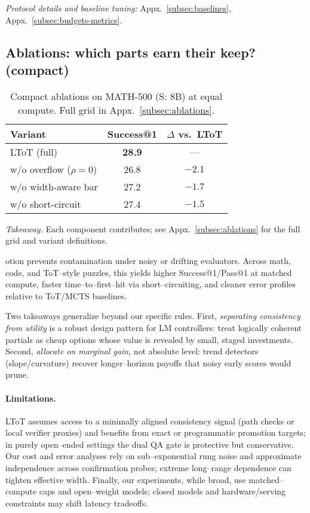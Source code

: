 \documentclass{article}
\begin{document}
\noindent\emph{Protocol details and baseline tuning:} Appx.~\ref{subsec:baselines}, Appx.~\ref{subsec:budgets-metrics}.
\subsection{Ablations: which parts earn their keep? (compact)}\label{subsec:ablations-mini}
\begin{table}[t]
\centering
\caption{Compact ablations on MATH-500 (S: 8B) at equal compute. Full grid in Appx.~\ref{subsec:ablations}.}
\vspace{0.3em}
\begin{tabular}{lcc}
\toprule
\textbf{Variant} & \textbf{Success@1} & \textbf{$\Delta$ vs.\ LToT} \\
\midrule
LToT (full)                         & \textbf{28.9} & --- \\
\quad w/o overflow ($\rho{=}0$)     & 26.8 & $-2.1$ \\
\quad w/o width-aware bar           & 27.2 & $-1.7$ \\
\quad w/o short-circuit             & 27.4 & $-1.5$ \\
\bottomrule
\end{tabular}
\label{tab:ablations-mini}
\end{table}
\noindent\textit{Takeaway.} Each component contributes; see Appx.~\ref{subsec:ablations} for the full grid and variant definitions.

otion prevents contamination under noisy or drifting evaluators.
Across math, code, and ToT--style puzzles, this yields higher Success@1/Pass@1 at matched compute, faster time--to--first--hit via short--circuiting, and cleaner error profiles relative to ToT/MCTS baselines.

Two takeaways generalize beyond our specific rules.
First, \emph{separating consistency from utility} is a robust design pattern for LM controllers: treat logically coherent partials as cheap options whose value is revealed by small, staged investments.
Second, \emph{allocate on marginal gain}, not absolute level: trend detectors (slope/curvature) recover longer--horizon payoffs that noisy early scores would prune.

\paragraph{Limitations.}
LToT assumes access to a minimally aligned consistency signal (path checks or local verifier proxies) and benefits from exact or programmatic promotion targets; in purely open--ended settings the dual QA gate is protective but conservative.
Our cost and error analyses rely on sub--exponential rung noise and approximate independence across confirmation probes; extreme long--range dependence can tighten effective width.
Finally, our experiments, while broad, use matched--compute caps and open--weight models; closed models and hardware/serving constraints may shift latency tradeoffs.
\end{document}
